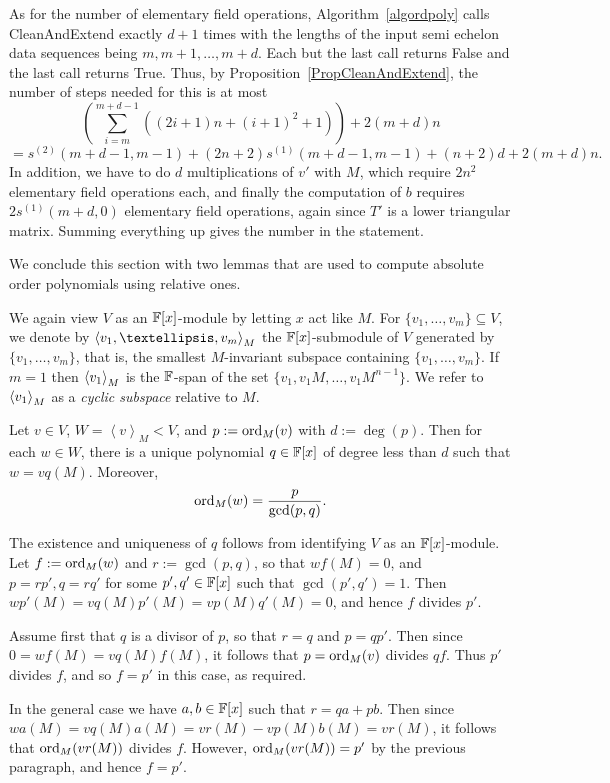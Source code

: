 As for the number of elementary field operations, Algorithm~\ref{algordpoly}
calls {\sc CleanAndExtend} exactly $d+1$ times with the lengths 
of the input semi echelon data sequences being $m,m+1, \ldots, m+d$. Each but the last call
returns {\sc False} and the last call returns {\sc True}. Thus, by
Proposition~\ref{PropCleanAndExtend}, the number of steps needed for this is at most
\[
\left(\sum_{i=m}^{m+d-1} ((2i+1)n+(i+1)^2+1)\right)  +  2(m+d)n  \]
\[
   = s^{(2)}(m+d-1,m-1) + (2n+2)s^{(1)}(m+d-1,m-1) + (n+2)d +2(m+d)n.
\]
In addition, we have to do $d$ multiplications of $v'$ with $M$, which require
$2n^2$ elementary field operations each, and finally the computation of $b$
requires $2s^{(1)}(m+d,0)$ elementary field operations, again since 
$T'$ is a lower triangular matrix. Summing everything up gives the number in 
the statement. 
\proofend

\smallskip
We conclude this section with two lemmas that are used to compute
absolute order polynomials using relative ones. 

We again view $V$ as
an $\mathbb{F}[x]$-module by letting $x$ act like $M$. For $\{v_1,\dots,v_m\}
\subseteq V$, we denote by $\la v_1,\dots,v_m\ra_M$ the $\mathbb{F}[x]$-submodule 
of $V$ generated by $\{v_1,\dots,v_m\}$, that is, the smallest $M$-invariant
subspace containing  $\{v_1,\dots,v_m\}$. If $m=1$ then $\left< v_1\right>_M$ 
is the $\mathbb{F}$-span of the set $\{v_1,v_1M,\dots, v_1M^{n-1}\}$. We refer to 
$\left< v_1\right>_M$ as a \emph{cyclic subspace} 
relative to $M$.

\begin{Lemm}
\label{ordpolcyclic}
Let $v\in V$, $W = \left< v \right>_M < V$, and
$p := \mathrm{ord}_M(v)$ with $d := \deg(p)$. 
Then for each $w \in W$, there is a unique polynomial
$q \in \mathbb{F}[x]$ of degree less than $d$ such that $w = vq(M)$.
Moreover,
\[ \mathrm{ord}_M(w) = \frac{p}{\gcd(p,q)}. \]
\end{Lemm}
\proofbeg
The existence and uniqueness of $q$ follows from identifying $V$ as an 
$\mathbb{F}[x]$-module. Let $f := \mathrm{ord}_M(w)$ and $r := \gcd(p,q)$, so that $wf(M)=0$, and 
$p=rp', q=rq'$ for some $p',q'\in\mathbb{F}[x]$ such that $\gcd(p',q')=1$. 
Then  $w p'(M) = v q(M) p'(M) = v p(M) 
q'(M) = 0$, and hence $f$  divides $p'$.

Assume first that $q$ is a divisor of $p$, so that $r = q$ and $p=qp'$. 
Then since $0=wf(M)=vq(M)f(M)$, it follows
that $p = \mathrm{ord}_M(v)$ divides $qf$. Thus $p'$ divides $f$, and so
$f=p'$ in this case, as required.

In the general case we have $a,b \in \mathbb{F}[x]$ such that 
$r = qa+pb$. Then since $wa(M) = vq(M)a(M) = vr(M) - vp(M)b(M) = vr(M)$,
it follows that $\mathrm{ord}_M(vr(M))$ divides $f$. However, $\mathrm{ord}_M(vr(M)) = p'$ 
by the previous paragraph, and hence $f = p'$.
\proofend

